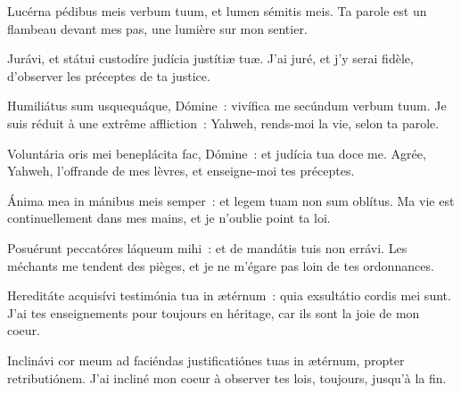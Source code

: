 
\begin{paracol}{2}

\LigneParacol{0cm}
{Lucérna pédibus meis verbum tuum, \GreStar{} et lumen sémitis meis.}
{Ta parole est un flambeau devant mes pas, une lumière sur mon sentier.}

\LigneParacol{0.2cm}
{Jurávi, et státui \GreStar{} custodíre judícia justítiæ tuæ.}
{J'ai juré, et j'y serai fidèle, d'observer les préceptes de ta justice.}

\LigneParacol{0.2cm}
{Humiliátus sum usquequáque, Dómine~: \GreStar{} vivífica me secúndum verbum tuum.}
{Je suis réduit à une extrême affliction~: Yahweh, rends-moi la vie, selon ta parole.}

\LigneParacol{0.2cm}
{Voluntária oris mei beneplácita fac, Dómine~: \GreStar{} et judícia tua doce me.}
{Agrée, Yahweh, l'offrande de mes lèvres, et enseigne-moi tes préceptes.}

\LigneParacol{0.2cm}
{Ánima mea in mánibus meis semper~: \GreStar{} et legem tuam non sum oblítus.}
{Ma vie est continuellement dans mes mains, et je n'oublie point ta loi.}

\LigneParacol{0.2cm}
{Posuérunt peccatóres láqueum mihi~: \GreStar{} et de mandátis tuis non errávi.}
{Les méchants me tendent des pièges, et je ne m'égare pas loin de tes ordonnances.}

\LigneParacol{0.2cm}
{Hereditáte acquisívi testimónia tua in ætérnum~: \GreStar{} quia exsultátio cordis mei sunt.}
{J'ai tes enseignements pour toujours en héritage, car ils sont la joie de mon coeur.}

\LigneParacol{0.2cm}
{Inclinávi cor meum ad faciéndas justificatiónes tuas in ætérnum, \GreStar{} propter retributiónem.}
{J'ai incliné mon coeur à observer tes lois, toujours, jusqu'à la fin. }

\end{paracol}
\Gloria
